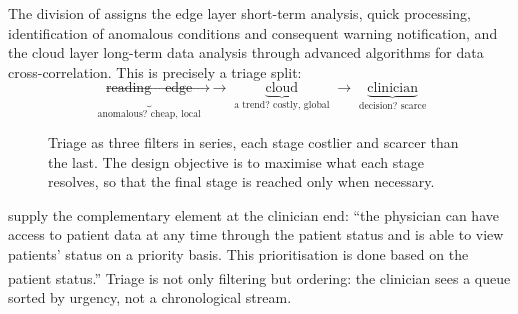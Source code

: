 \documentclass[12pt,a4paper,oneside]{report}
\newcommand{\bq}[1]{``#1''\textsuperscript{\dag}}
\begin{document}
The division of \textcite{mucchi2021} assigns the edge layer short-term analysis, quick processing, identification of anomalous conditions and consequent warning notification, and the cloud layer long-term data analysis through advanced algorithms for data cross-correlation. This is precisely a triage split:
\begin{equation*}
  \underbrace{\text{reading} \rightarrow \text{edge}}_{\text{anomalous? cheap, local}}
  \;\longrightarrow\;
  \underbrace{\text{cloud}}_{\text{a trend? costly, global}}
  \;\longrightarrow\;
  \underbrace{\text{clinician}}_{\text{decision? scarce}}
\end{equation*}

\begin{figure}[htbp]
\centering
{}
\caption{Triage as three filters in series, each stage costlier and scarcer than the last. The design objective is to maximise what each stage resolves, so that the final stage is reached only when necessary.}\label{fig:triage-cascade}
\end{figure}

\Textcite{yazdani2018} supply the complementary element at the clinician end: \bq{the physician can have access to patient data at any time through the patient status and is able to view patients' status on a priority basis. This prioritisation is done based on the patient status.} Triage is not only filtering but ordering: the clinician sees a queue sorted by urgency, not a chronological stream.
\end{document}
